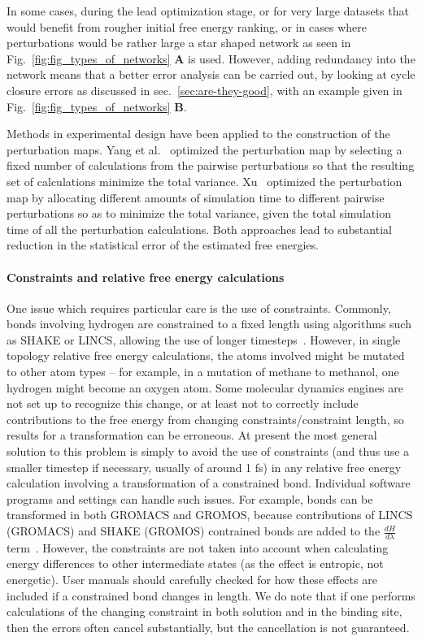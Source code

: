 \documentclass[9pt,bestpractices]{livecoms}
\begin{document}
In some cases, during the lead optimization stage, or for very large datasets that would benefit from rougher initial free energy ranking, or in cases where perturbations would be rather large a star shaped network as seen in Fig.~\ref{fig:fig_types_of_networks} \textbf{A} is used. However, adding redundancy into the network means that a better error analysis can be carried out, by looking at cycle closure errors as discussed in sec.~\ref{sec:are-they-good}, with an example given in Fig.~\ref{fig:fig_types_of_networks} \textbf{B}.


Methods in experimental design have been applied to the construction of the perturbation maps. Yang et al.~\cite{yang2020optimal} optimized the perturbation map by selecting a fixed number of calculations from the pairwise perturbations so that the resulting set of calculations minimize the total variance. Xu~\cite{xu2019optimal} optimized the perturbation map by allocating different amounts of simulation time to different pairwise perturbations so as to minimize the total variance, given the total simulation time of all the perturbation calculations. Both approaches lead to substantial reduction in the statistical error of the estimated free energies.  


\paragraph{Constraints and relative free energy calculations}
One issue which requires particular care is the use of constraints.
Commonly, bonds involving hydrogen are constrained to a fixed length using algorithms such as SHAKE or LINCS, allowing the use of longer timesteps~\cite{krautler2001fast}.
However, in single topology relative free energy calculations, the atoms involved might be mutated to other atom types -- for example, in a mutation of methane to methanol, one hydrogen might become an oxygen atom.
Some molecular dynamics engines are not set up to recognize this change, or at least not to correctly include contributions to the free energy from changing constraints/constraint length, so results for a transformation can be erroneous.
At present the most general solution to this problem is simply to avoid the use of constraints (and thus use a smaller timestep if necessary, usually of around 1 fs) in any relative free energy calculation involving a transformation of a constrained bond. Individual software programs and settings can handle such issues. For example, bonds can be transformed in both GROMACS and GROMOS, because contributions of LINCS (GROMACS) and SHAKE (GROMOS) contrained bonds are added to the $\frac{dH}{d\lambda}$ term~\cite{pearlman1993determining, straatsma1992holonomica, pearlman1991overlooked, gunsteren1997computer}. However, the constraints are not taken into account when calculating energy differences to other intermediate states (as the effect is entropic, not energetic). User manuals should carefully checked for how these effects are included if a constrained bond changes in length. We do note that if one performs calculations of the changing constraint in both solution and in the binding site, then the errors often cancel substantially, but the cancellation is not guaranteed.
\end{document}
